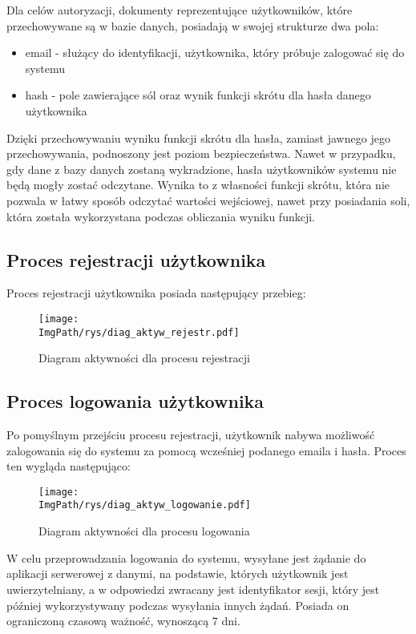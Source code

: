 \documentclass[a4paper,12pt,twoside,openany]{report}
\newcommand{\ImgPath}{.}
\begin{document}
Dla celów autoryzacji, dokumenty reprezentujące użytkowników, które przechowywane są w bazie danych, posiadają w swojej strukturze dwa pola:
\begin{itemize}
	\item email - służący do identyfikacji, użytkownika, który próbuje zalogować się do systemu
	
	\item hash - pole zawierające sól oraz wynik funkcji skrótu dla hasła danego użytkownika
	
\end{itemize}
Dzięki przechowywaniu wyniku funkcji skrótu dla hasła, zamiast jawnego jego przechowywania, podnoszony jest poziom bezpieczeństwa. Nawet w przypadku, gdy dane z bazy danych zostaną wykradzione, hasła użytkowników systemu nie będą mogły zostać odczytane. Wynika to z własności funkcji skrótu, która nie pozwala w łatwy sposób odczytać wartości wejściowej, nawet przy posiadania soli, która została wykorzystana podczas obliczania wyniku funkcji.

\newpage
\subsection{Proces rejestracji użytkownika}

Proces rejestracji użytkownika posiada następujący przebieg:
 \begin{figure}[!htbp]
	\begin{center}
		\centering
		\texttt{[image: \\ImgPath/rys/diag\_aktyw\_rejestr.pdf]}
	\end{center}
	\caption{Diagram aktywności dla procesu rejestracji}
	\label{diagramAktywnosciRejstracja}
\end{figure}
\newpage

\subsection{Proces logowania użytkownika}
Po pomyślnym przejściu procesu rejestracji, użytkownik nabywa możliwość zalogowania się do systemu za pomocą wcześniej podanego emaila i hasła. Proces ten wygląda następująco:


\begin{figure}[!htbp]
	\begin{center}
		\centering
		\texttt{[image: \\ImgPath/rys/diag\_aktyw\_logowanie.pdf]}
	\end{center}
	\caption{Diagram aktywności dla procesu logowania}
	\label{diagramAktywnosciLogowanie}
\end{figure}
\newpage
W celu przeprowadzania logowania do systemu, wysyłane jest żądanie do aplikacji serwerowej z danymi, na podstawie, których użytkownik jest uwierzytelniany, a w odpowiedzi zwracany jest identyfikator sesji, który jest później wykorzystywany podczas wysyłania innych żądań. Posiada on ograniczoną czasową ważność, wynoszącą 7 dni.
\end{document}
